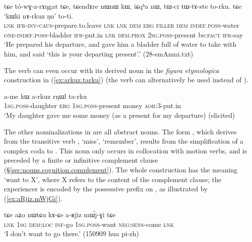 \begin{exe}
\ex \label{ex:kWki.nArkuz.Nu}
\gll tɕe tó-wɣ-z-rɤŋgat tɕe, tɕendɤre nɯnɯ kɯ, iɕqʰa nɯ,  tɯ-ci tɯ-tɤ-ste to-rku. tɕe `kɯki nɤ-rkuz ŋu' to-ti. \\
\textsc{lnk} \textsc{ifr}-\textsc{inv}-\textsc{caus}-prepare.to.leave \textsc{lnk} \textsc{lnk} \textsc{dem} \textsc{erg} \textsc{filler} \textsc{dem} \textsc{indef}.\textsc{poss}-water \textsc{one}-\textsc{indef}.\textsc{poss}-bladder \textsc{ifr}-put.in \textsc{lnk} \textsc{dem}.\textsc{prox} \textsc{2sg}.\textsc{poss}-present be:\textsc{fact} \textsc{ifr}-say \\
\glt `He prepared his departure, and gave him a bladder full of water to take with him, and said `this is your departing present'.' (28-smAnmi.txt)
\end{exe}


The verb  can even occur with its derived noun  in the \textit{figura etymologica} construction in (\ref{ex:arkuz.tarku}) (the verb  can alternatively be used instead of ).

\begin{exe}
\ex \label{ex:arkuz.tarku}
\gll a-me kɯ a-rkuz rŋɯl ta-rku \\
\textsc{1sg}.\textsc{poss}-daughter \textsc{erg} \textsc{1sg}.\textsc{poss}-present money \textsc{aor}:3\flobv{}-put.in \\
\glt `My daughter gave me some money (as a present for my departure) (elicited)
\end{exe}

The other nominalizations in  are all abstract nouns. The form , which derives from the transitive verb , `miss', `remember', results from the simplification of a complex coda  to . This noun only occurs in collocation with motion verbs, and is preceded by a finite or infinitive complement clause (§\ref{sec:nouns.cognition.complement}). The whole construction has the meaning `want to X', where X refers to the content of the complement clause; the experiencer is encoded by the possessive prefix on , as illustrated by (\ref{ex:aRjiz.mWjGi}).

\begin{exe}
\ex \label{ex:aRjiz.mWjGi}
\gll  tɕe aʑo nɯtɕu kɤ-ɕe a-ʁjiz mɯ́j-ɣi tɕe \\
\textsc{lnk} \textsc{1sg} \textsc{dem}:\textsc{loc} \textsc{inf}-go \textsc{1sg}.\textsc{poss}-want \textsc{neg}:\textsc{sens}-come \textsc{lnk} \\
\glt `I don't want to go there.' (150909 hua pi-zh)
\end{exe}


